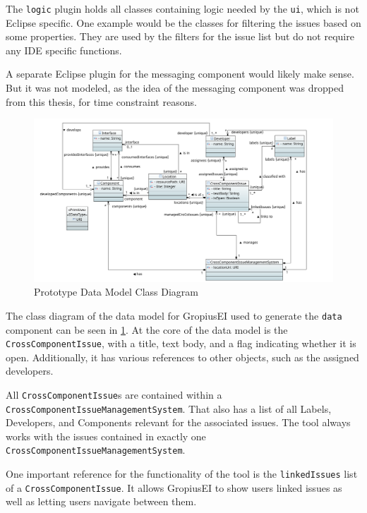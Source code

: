 The \lstinline|logic| plugin holds all classes containing logic needed by the \lstinline|ui|, which is not \gls{Eclipse} specific.
One example would be the classes for filtering the issues based on some properties.
They are used by the filters for the issue list but do not require any \gls{IDE} specific functions.

A separate \gls{Eclipse} plugin for the messaging component would likely make sense.
But it was not modeled, as the idea of the messaging component was dropped from this thesis, for time constraint reasons.

\begin{figure}[!h]
	\centering
	\includegraphics[width=\textwidth]{graphics/dataClassDiagram.png}
	\caption{Prototype Data Model Class Diagram}
	\label{fig:c4:data_class_diagram}
\end{figure}
The class diagram of the data model for \gls{GropiusEI} used to generate the \lstinline|data| component can be seen in \cref{fig:c4:data_class_diagram}.
At the core of the data model is the \lstinline|CrossComponentIssue|, with a title, text body, and a flag indicating whether it is open.
Additionally, it has various references to other objects, such as the assigned developers.

All \lstinline|CrossComponentIssue|s are contained within a \lstinline|CrossComponentIssueManagementSystem|.
That also has a list of all Labels, Developers, and Components relevant for the associated issues.
The tool always works with the issues contained in exactly one \lstinline|CrossComponentIssueManagementSystem|.

One important reference for the functionality of the tool is the \lstinline|linkedIssues| list of a \lstinline|CrossComponentIssue|.
It allows \gls{GropiusEI} to show users linked issues as well as letting users navigate between them.

